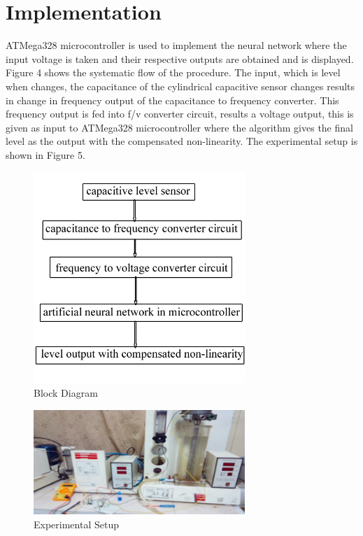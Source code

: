 \documentclass[conference]{IEEEtran}
\begin{document}
\section{Implementation}
ATMega328 microcontroller is used to implement the neural network where the input voltage is taken and their respective outputs are obtained and is displayed. Figure 4 shows the systematic flow of the procedure. The input, which is level when changes, the capacitance of the cylindrical capacitive sensor changes results in change in frequency output of the capacitance to frequency converter. This frequency output is fed into f/v converter circuit, results a voltage output, this is given as input to ATMega328 microcontroller where the algorithm gives the final level as the output with the compensated non-linearity. The experimental setup is shown in Figure 5.\\
\begin{figure}[h]
\includegraphics[width=8cm]{blockdiagram.png}
\centering
\caption{Block Diagram}\label{Fig4}
\end{figure}
\begin{figure}[h]
\includegraphics[width=8cm]{setup.png}
\centering
\caption{Experimental Setup}\label{Fig5}
\end{figure}
\end{document}
